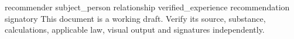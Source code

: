 \documentclass[11pt,a4paper]{article}
\begin{document}
{{recommender}}
{{subject_person}}
{{relationship}}
{{verified_experience}}
{{recommendation}}
{{signatory}}
This document is a working draft. Verify its source, substance, calculations, applicable law, visual output and signatures independently.
\end{document}
